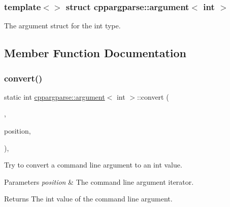 \subsubsection*{template$<$$>$\newline
struct cppargparse\+::argument$<$ int $>$}

The argument struct for the int type. 

\subsection{Member Function Documentation}
\mbox{\label{structcppargparse_1_1argument_3_01int_01_4_a8c3b45ea01897660bf5d1e5f7c9d7c41}} 
\subsubsection{\texorpdfstring{convert()}{convert()}}
{\footnotesize\ttfamily static int \hyperlink{structcppargparse_1_1argument}{cppargparse\+::argument}$<$ int $>$\+::convert (\begin{DoxyParamCaption}\item[{const \hyperlink{types_8h_a80adf2418b7ce9fe616698efa7533ecf}{types\+::\+Command\+Line\+\_\+t} \&}]{,  }\item[{const \hyperlink{types_8h_a43b4f43f8940de1bf09ced6f1b668053}{types\+::\+Command\+Line\+Position\+\_\+t} \&}]{position,  }\item[{const \hyperlink{types_8h_a003c660afe2ee9c6cc39aea966e8926d}{types\+::\+Command\+Line\+Arguments\+\_\+t} \&}]{ }\end{DoxyParamCaption})\hspace{0.3cm}{\ttfamily [inline]}, {\ttfamily [static]}}



Try to convert a command line argument to an int value. 


\begin{DoxyParams}{Parameters}
{\em position} & The command line argument iterator.\\
\hline
\end{DoxyParams}
\begin{DoxyReturn}{Returns}
The int value of the command line argument. 
\end{DoxyReturn}
\mbox{\label{structcppargparse_1_1argument_3_01int_01_4_af6a2f748b086ad7122f7bb6affbe354e}} 
